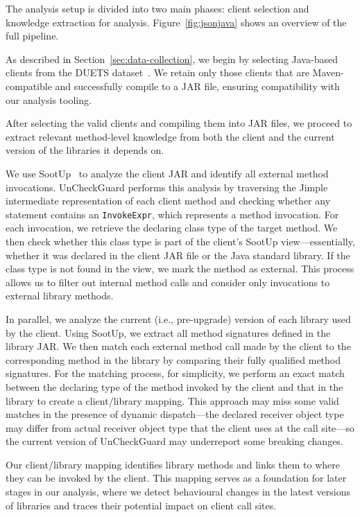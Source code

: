 The analysis setup is divided into two main phases: client selection and knowledge extraction for analysis. Figure~\ref{fig:jsonjava} shows an overview of the full pipeline.

As described in Section~\ref{sec:data-collection}, we begin by selecting Java-based clients from the DUETS dataset~\cite{durieux21:_duets}. We retain only those clients that are Maven-compatible and successfully compile to a JAR file, ensuring compatibility with our analysis tooling.

After selecting the valid clients and compiling them into JAR files, we proceed to extract relevant method-level knowledge from both the client and the current version of the libraries it depends on.

We use SootUp~\cite{Karakaya24:_sootup} to analyze the client JAR and identify all external method invocations. UnCheckGuard performs this analysis by traversing the Jimple intermediate representation of each client method and checking whether any statement contains an \texttt{InvokeExpr}, which represents a method invocation. For each invocation, we retrieve the declaring class type of the target method. We then check whether this class type is part of the client’s SootUp view---essentially, whether it was declared in the client JAR file or the Java standard library. If the class type is not found in the view, we mark the method as external. This process allows us to filter out internal method calls and consider only invocations to external library methods.

In parallel, we analyze the current (i.e., pre-upgrade) version of each library used by the client. Using SootUp, we extract all method signatures defined in the library JAR. We then match each external method call made by the client to the corresponding method in the library by comparing their fully qualified method signatures. For the matching process, for simplicity, we perform an exact match between the declaring type of the method invoked by the client and that in the library to create a client/library mapping. This approach may miss some valid matches in the presence of dynamic dispatch---the declared receiver object type may differ from actual receiver object type that the client uses at the call site---so the current version of UnCheckGuard may underreport some breaking changes.

Our client/library mapping identifies library methods and links them to where they can be invoked by the client. This mapping serves as a foundation for later stages in our analysis, where we detect behavioural changes in the latest versions of libraries and traces their potential impact on client call sites.

